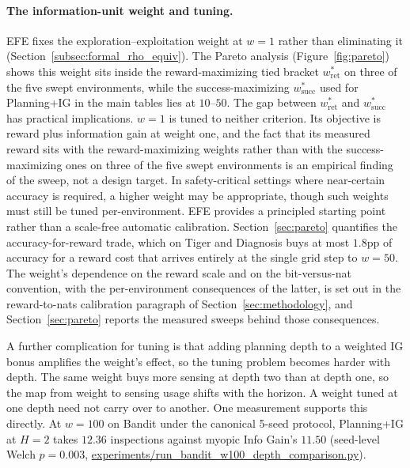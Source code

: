 \paragraph{The information-unit weight and tuning.}
EFE fixes the exploration--exploitation weight at $w{=}1$ rather than eliminating it (Section~\ref{subsec:formal_rho_equiv}). The Pareto analysis (Figure~\ref{fig:pareto}) shows this weight sits inside the reward-maximizing tied bracket $w^*_{\text{ret}}$ on three of the five swept environments, while the success-maximizing $w^*_{\text{succ}}$ used for Planning+IG in the main tables lies at $10$--$50$. The gap between $w^*_{\text{ret}}$ and $w^*_{\text{succ}}$ has practical implications. $w{=}1$ is tuned to neither criterion. Its objective is reward plus information gain at weight one, and the fact that its measured reward sits with the reward-maximizing weights rather than with the success-maximizing ones on three of the five swept environments is an empirical finding of the sweep, not a design target. In safety-critical settings where near-certain accuracy is required, a higher weight may be appropriate, though such weights must still be tuned per-environment. EFE provides a principled starting point rather than a scale-free automatic calibration. Section~\ref{sec:pareto} quantifies the accuracy-for-reward trade, which on Tiger and Diagnosis buys at most $1.8$pp of accuracy for a reward cost that arrives entirely at the single grid step to $w{=}50$. The weight's dependence on the reward scale and on the bit-versus-nat convention, with the per-environment consequences of the latter, is set out in the reward-to-nats calibration paragraph of Section~\ref{sec:methodology}, and Section~\ref{sec:pareto} reports the measured sweeps behind those consequences.

A further complication for tuning is that adding planning depth to a weighted IG bonus amplifies the weight's effect, so the tuning problem becomes harder with depth. The same weight buys more sensing at depth two than at depth one, so the map from weight to sensing usage shifts with the horizon. A weight tuned at one depth need not carry over to another. One measurement supports this directly. At $w{=}100$ on Bandit under the canonical 5-seed protocol, Planning+IG at $H{=}2$ takes $12.36$ inspections against myopic Info Gain's $11.50$ (seed-level Welch $p{=}0.003$, \url{experiments/run_bandit_w100_depth_comparison.py}).

